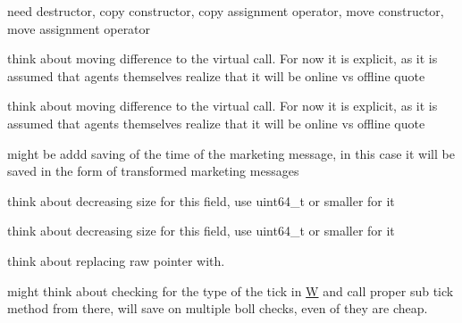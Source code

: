 
\begin{DoxyRefList}
\item[\label{_dev_stage2__DevStage2000003}%
\hypertarget{_dev_stage2__DevStage2000003}{}%
Member \hyperlink{classsolar__core_1_1_household_add38a49b76c2836a50a89e75318414f1}{solar\+\_\+core\+:\+:Household\+:\+:ac\+\_\+inf\+\_\+marketing\+\_\+sei} () override]need destructor, copy constructor, copy assignment operator, move constructor, move assignment operator

think about moving difference to the virtual call. For now it is explicit, as it is assumed that agents themselves realize that it will be online vs offline quote 

think about moving difference to the virtual call. For now it is explicit, as it is assumed that agents themselves realize that it will be online vs offline quote  
\item[\label{_dev_stage2__DevStage2000001}%
\hypertarget{_dev_stage2__DevStage2000001}{}%
Member \hyperlink{classsolar__core_1_1_household_ac9d26af7b52f0cdc357fc5dca4b86ad9}{solar\+\_\+core\+:\+:Household\+:\+:get\+\_\+inf} (std\+::shared\+\_\+ptr$<$ Mes\+Marketing\+S\+E\+I $>$ mes\+\_\+) override]might be addd saving of the time of the marketing message, in this case it will be saved in the form of transformed marketing messages  
\item[\label{_dev_stage2__DevStage2000005}%
\hypertarget{_dev_stage2__DevStage2000005}{}%
Member \hyperlink{classsolar__core_1_1_household_a1104d8264fe733937e1fd2e9ad0f8fc1}{solar\+\_\+core\+:\+:Household\+:\+:house} ]think about decreasing size for this field, use uint64\+\_\+t or smaller for it  
\item[\label{_dev_stage2__DevStage2000004}%
\hypertarget{_dev_stage2__DevStage2000004}{}%
Member \hyperlink{classsolar__core_1_1_household_a1ba6b7af82982096e05d99a70a2647eb}{solar\+\_\+core\+:\+:Household\+:\+:location\+\_\+y} ]think about decreasing size for this field, use uint64\+\_\+t or smaller for it  
\item[\label{_dev_stage2__DevStage2000006}%
\hypertarget{_dev_stage2__DevStage2000006}{}%
Member \hyperlink{classsolar__core_1_1_household_a297842358a2d79db160566106972bc0d}{solar\+\_\+core\+:\+:Household\+:\+:preliminary\+\_\+quotes} ]think about replacing raw pointer with. 
\item[\label{_dev_stage2__DevStage2000007}%
\hypertarget{_dev_stage2__DevStage2000007}{}%
Member \hyperlink{classsolar__core_1_1_s_e_i_ab0bd6ae650afc15fe71ce545373ab16e}{solar\+\_\+core\+:\+:S\+E\+I\+:\+:act\+\_\+tick} ()]might think about checking for the type of the tick in \hyperlink{classsolar__core_1_1_w}{W} and call proper sub tick method from there, will save on multiple boll checks, even of they are cheap.  

\end{DoxyRefList}
